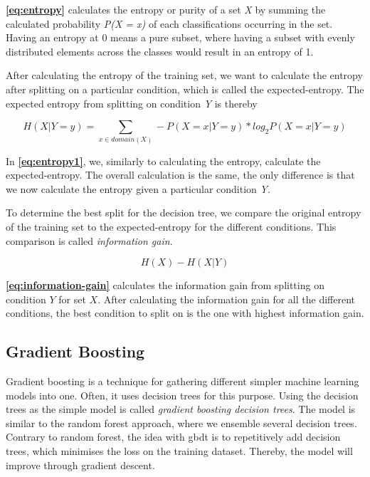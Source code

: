 \textbf{\autoref{eq:entropy}} calculates the entropy or purity of a set \textit{X} by summing the calculated probability \textit{P(X = x)} of each classifications occurring in the set. Having an entropy at 0 means a pure subset, where having a subset with evenly distributed elements across the classes would result in an entropy of 1. 

After calculating the entropy of the training set, we want to calculate the entropy after splitting on a particular condition, which is called the expected-entropy. The expected entropy from splitting on condition \textit{Y} is thereby

\begin{equation} \label{eq:entropy1}
    H(X | Y = y) = \sum_{x \in domain(X)} - P(X = x | Y = y) * log_{2} P(X = x | Y = y)
\end{equation}

In \textbf{\autoref{eq:entropy1}}, we, similarly to calculating the entropy, calculate the expected-entropy. The overall calculation is the same, the only difference is that we now calculate the entropy given a particular condition \textit{Y}.

To determine the best split for the decision tree, we compare the original entropy of the training set to the expected-entropy for the different conditions. This comparison is called \textit{information gain}.

\begin{equation} \label{eq:information-gain}
    H(X) - H(X | Y)
\end{equation}

\textbf{\autoref{eq:information-gain}} calculates the information gain from splitting on condition $Y$ for set $X$. After calculating the information gain for all the different conditions, the best condition to split on is the one with highest information gain.

\subsection{Gradient Boosting}
Gradient boosting is a technique for gathering different simpler machine learning models into one. Often, it uses decision trees for this purpose. Using the decision trees as the simple model is called \textit{gradient boosting decision trees}. The model is similar to the random forest approach, where we ensemble several decision trees. Contrary to random forest, the idea with \gls{gbdt} is to repetitively add decision trees, which minimises the loss on the training dataset. Thereby, the model will improve through gradient descent.\cite[Chapter~12]{GradientBoosting}

